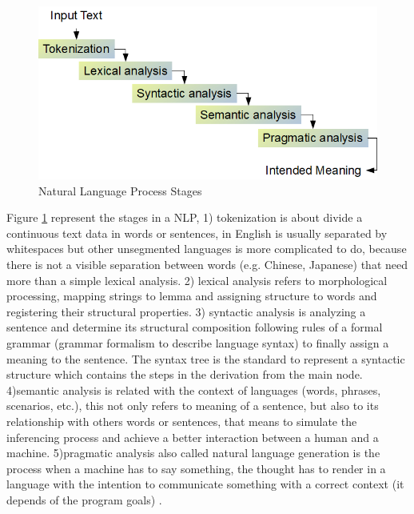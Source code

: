 \documentclass[12pt]{report}
\begin{document}
\begin{figure}[H]	
	\centering
	\includegraphics[width=150mm, scale = 1]{images/4_nlp.png}	
	\caption{Natural Language Process Stages}	
	\label{figure:NLP_Stages}
\end{figure}

Figure \ref{figure:NLP_Stages} represent the stages in a \ac{NLP}, 1) tokenization is about divide a continuous text data in words or sentences, in English is usually separated by whitespaces but other unsegmented languages is more complicated to do, because there is not a visible separation between words (e.g. Chinese, Japanese) that need more than a simple lexical analysis. 2) lexical analysis refers to morphological processing, mapping strings to lemma and assigning structure to words and registering their structural properties. 3) syntactic analysis is analyzing a sentence and determine its structural composition following rules of a formal grammar (grammar formalism to describe language syntax) to finally assign a meaning to the sentence. The syntax tree is the standard to represent a syntactic structure which contains the steps in the derivation from the main node. 4)semantic analysis is related with the context of languages (words, phrases, scenarios, etc.), this not only refers to meaning of a sentence, but also to its relationship with others words or sentences, that means to simulate the inferencing process and achieve a better interaction between a human and a machine.  5)pragmatic analysis also called natural language generation is the process when a machine has to say something, the thought has to render in a language with the intention to communicate something with a correct context (it depends of the program goals) \cite{ Indurkhya2010}.
\end{document}
